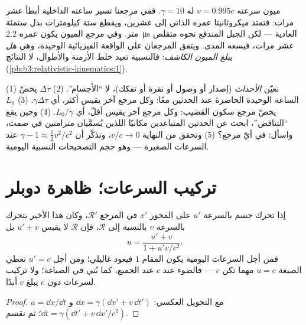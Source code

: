 \begin{example}\label{ex:b3:relativistic-kinematics:muon}
ميون سرعته $v = 0.995c$ له $\gamma = 10$. ففي مرجعنا تسير ساعته
الداخلية أبطأ عشر مرات: فتمتد ميكروثانيتا عمره الذاتي إلى عشرين،
ويقطع ستة كيلومترات بدل ستمئة متر.
وفي مرجع الميون يكون عمره \qty{2.2}{\micro s} العادية ---
لكن الجبل المندفع نحوه متقلص عشر مرات، فيسعه المدى. ويتفق
المرجعان على الواقعة الفيزيائية الوحيدة، وهي \emph{هل يبلغ
الميون الكاشف}: فالنسبية تعيد خلط الأزمنة والأطوال، لا النتائج
(\cref{pb:b3:relativistic-kinematics:1}).
\end{example}

\begin{method}\label{met:b3:relativistic-kinematics:method}
(1) نعيّن \emph{الأحداث} (إصدار أو وصول أو نقرة أو تفكك)، لا
``الأجسام''. (2)  $\Delta\tau$ يخصّ الساعة الوحيدة
الحاضرة عند الحدثين معًا: وكل مرجع آخر يقيس أكثر، أي
$\gamma\Delta\tau$. (3)  $L_0$ يخصّ مرجع سكون
القضيب: وكل مرجع آخر يقيس أقلّ، أي $L_0/\gamma$. (4) وحين
يقع ``التناقض''، ابحث عن الحدثين المتباعدين مكانيًا اللذين
يُسمَّيان متزامنين في صمت، واسأل: في أيّ مرجع؟ (5) وتحقق من
النهاية $v/c \to 0$، وتذكّر أن $\gamma - 1 \approx \tfrac12 v^2/c^2$
عند السرعات الصغيرة --- وهو حجم التصحيحات النسبية اليومية.
\end{method}

\section{تركيب السرعات؛ ظاهرة دوبلر}

\begin{proposition}\label{prop:b3:relativistic-kinematics:addition}
إذا تحرك جسم بالسرعة $u'$ على المحور $x'$ في المرجع $\mathcal R'$،
وكان هذا الأخير يتحرك بالسرعة $v$ بالنسبة إلى $\mathcal R$، فإن
$\mathcal R$ لا يقيس $u' + v$ بل
\[
u = \frac{u' + v}{1 + u'v/c^2} .
\]
فمن أجل السرعات اليومية يكون المقام $1$ فيعود غاليلي؛ ومن أجل
$u' = c$ تعطي الصيغة $u = c$ مهما تكن $v$ --- فالضوء عند $c$
عند الجميع، كما بُني في الصياغة؛ ولا تركيب لسرعات دون $c$ يبلغ
$c$ أبدًا.
\end{proposition}

\begin{proof}
$u = \dd x/\dd t$ مع التحويل العكسي: $\dd x =
\gamma(\dd x' + v\,\dd t')$ و $\dd t = \gamma(\dd t' + v\,\dd x'/c^2)$؛
ثم نقسم.
\end{proof}

